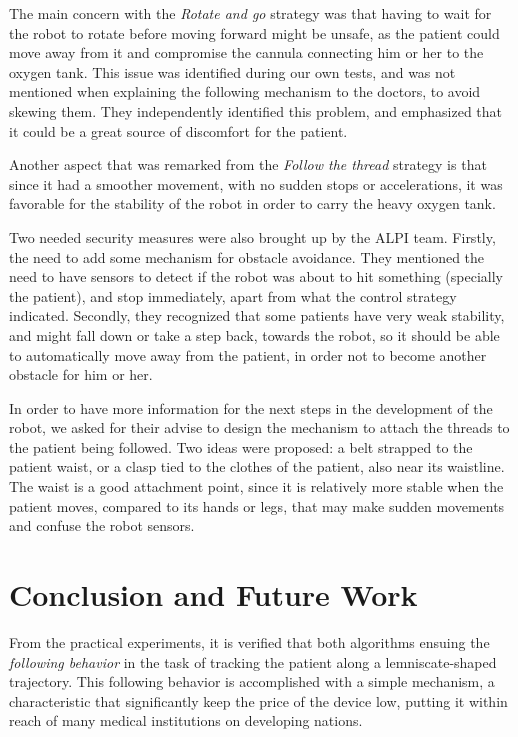 \documentclass[journal]{IEEEtran}
\begin{document}
The main concern with the \textit{Rotate and go} strategy was that having to wait for the robot to rotate before moving forward might be unsafe, as the patient could move away from it and compromise the cannula connecting him or her to the oxygen tank. This issue was identified during our own tests, and was not mentioned when explaining the following mechanism to the doctors, to avoid skewing them. They independently identified this problem, and emphasized that it could be a great source of discomfort for the patient.

Another aspect that was remarked from the \textit{Follow the thread} strategy is that since it had a smoother movement, with no sudden stops or accelerations, it was favorable for the stability of the robot in order to carry the heavy oxygen tank.

Two needed security measures were also brought up by the ALPI team. Firstly, the need to add some mechanism for obstacle avoidance. They mentioned the need to have sensors to detect if the robot was about to hit something (specially the patient), and stop immediately, apart from what the control strategy indicated. Secondly, they recognized that some patients have very weak stability, and might fall down or take a step back, towards the robot, so it should be able to automatically move away from the patient, in order not to become another obstacle for him or her. 

In order to have more information for the next steps in the development of the robot, we asked for their advise to design the mechanism to attach the threads to the patient being followed. Two ideas were proposed: a belt strapped to the patient waist, or a clasp tied to the clothes of the patient, also near its waistline. The waist is a good attachment point, since it is relatively more stable when the patient moves, compared to its hands or legs, that may make sudden movements and confuse the robot sensors. 


\section{Conclusion and Future Work}
\label{conclusion}

From the practical experiments, it is verified that both algorithms ensuing the \textit{following behavior}  in the task of tracking the patient along a lemniscate-shaped trajectory. This following behavior is accomplished with a simple mechanism, a characteristic that significantly keep the price of the device low, putting it within reach of many medical institutions on developing nations.
\end{document}
